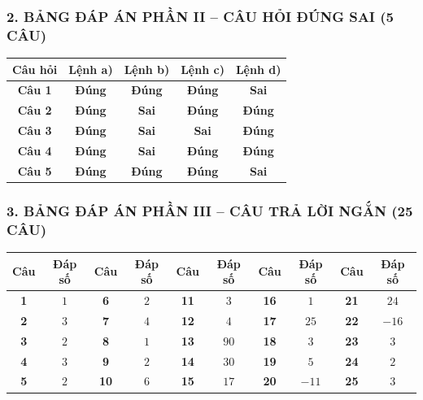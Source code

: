 \documentclass[12pt,a4paper]{article}
\begin{document}
\subsubsection*{2. BẢNG ĐÁP ÁN PHẦN II -- CÂU HỎI ĐÚNG SAI (5 CÂU)}

\begin{center}
\renewcommand{\arraystretch}{1.22}
\begin{tabular}{|c|c|c|c|c|}
\hline
\textbf{Câu hỏi} & \textbf{Lệnh a)} & \textbf{Lệnh b)} & \textbf{Lệnh c)} & \textbf{Lệnh d)} \\ \hline
\textbf{Câu 1} & \textbf{Đúng} & \textbf{Đúng} & \textbf{Đúng} & \textbf{Sai} \\ \hline
\textbf{Câu 2} & \textbf{Đúng} & \textbf{Sai} & \textbf{Đúng} & \textbf{Đúng} \\ \hline
\textbf{Câu 3} & \textbf{Đúng} & \textbf{Sai} & \textbf{Sai} & \textbf{Đúng} \\ \hline
\textbf{Câu 4} & \textbf{Đúng} & \textbf{Sai} & \textbf{Đúng} & \textbf{Đúng} \\ \hline
\textbf{Câu 5} & \textbf{Đúng} & \textbf{Đúng} & \textbf{Đúng} & \textbf{Sai} \\ \hline
\end{tabular}
\end{center}

\subsubsection*{3. BẢNG ĐÁP ÁN PHẦN III -- CÂU TRẢ LỜI NGẮN (25 CÂU)}

\begin{center}
\renewcommand{\arraystretch}{1.22}
\begin{tabular}{|c|c||c|c||c|c||c|c||c|c|}
\hline
\textbf{Câu} & \textbf{Đáp số} & \textbf{Câu} & \textbf{Đáp số} & \textbf{Câu} & \textbf{Đáp số} & \textbf{Câu} & \textbf{Đáp số} & \textbf{Câu} & \textbf{Đáp số} \\ \hline
\textbf{1} & $1$ & \textbf{6} & $2$ & \textbf{11} & $3$ & \textbf{16} & $1$ & \textbf{21} & $24$ \\ \hline
\textbf{2} & $3$ & \textbf{7} & $4$ & \textbf{12} & $4$ & \textbf{17} & $25$ & \textbf{22} & $-16$ \\ \hline
\textbf{3} & $2$ & \textbf{8} & $1$ & \textbf{13} & $90$ & \textbf{18} & $3$ & \textbf{23} & $3$ \\ \hline
\textbf{4} & $3$ & \textbf{9} & $2$ & \textbf{14} & $30$ & \textbf{19} & $5$ & \textbf{24} & $2$ \\ \hline
\textbf{5} & $2$ & \textbf{10} & $6$ & \textbf{15} & $17$ & \textbf{20} & $-11$ & \textbf{25} & $3$ \\ \hline
\end{tabular}
\end{center}
\end{document}
